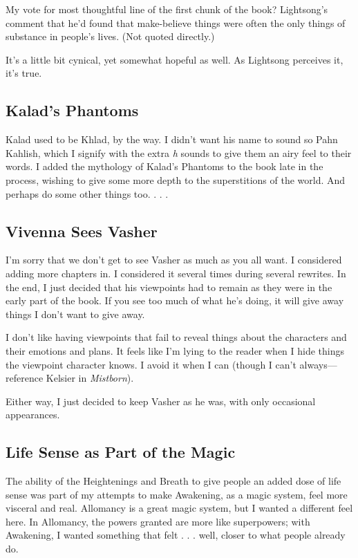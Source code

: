 My vote for most thoughtful line of the first chunk of the book? Lightsong’s comment that he’d found that make-believe things were often the only things of substance in people’s lives. (Not quoted directly.)

It’s a little bit cynical, yet somewhat hopeful as well. As Lightsong perceives it, it’s true.

\subsection*{Kalad’s Phantoms}

Kalad used to be Khlad, by the way. I didn’t want his name to sound so Pahn Kahlish, which I signify with the extra \textit{h} sounds to give them an airy feel to their words. I added the mythology of Kalad’s Phantoms to the book late in the process, wishing to give some more depth to the superstitions of the world. And perhaps do some other things too. . . .

\subsection*{Vivenna Sees Vasher}

I’m sorry that we don’t get to see Vasher as much as you all want. I considered adding more chapters in. I considered it several times during several rewrites. In the end, I just decided that his viewpoints had to remain as they were in the early part of the book. If you see too much of what he’s doing, it will give away things I don’t want to give away.

I don’t like having viewpoints that fail to reveal things about the characters and their emotions and plans. It feels like I’m lying to the reader when I hide things the viewpoint character knows. I avoid it when I can (though I can’t always—reference Kelsier in \textit{Mistborn}).

Either way, I just decided to keep Vasher as he was, with only occasional appearances.

\subsection*{Life Sense as Part of the Magic}

The ability of the Heightenings and Breath to give people an added dose of life sense was part of my attempts to make Awakening, as a magic system, feel more visceral and real. Allomancy is a great magic system, but I wanted a different feel here. In Allomancy, the powers granted are more like superpowers; with Awakening, I wanted something that felt . . . well, closer to what people already do.

